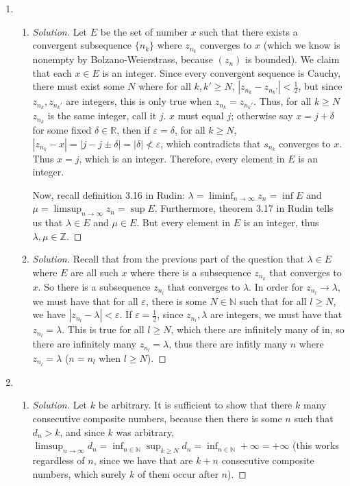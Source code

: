 \documentclass{article}
\newcommand{\N}{{\mathbb N}}
\newcommand{\Z}{{\mathbb Z}}
\newcommand{\R}{{\mathbb R}}
\newcommand{\ep}{{\varepsilon}}
\begin{document}
\begin{enumerate}
	\item
	\begin{enumerate}
		\item \begin{proof}[Solution]\let\qed\relax
			Let $E$ be the set of number $x$ such that
			there exists a convergent subsequence $\{n_k\}$ where
			$z_{n_k}$ converges to $x$
			(which we know is nonempty by Bolzano-Weierstrass,
			because $(z_n)$ is bounded).
			We claim that each $x \in E$ is an integer.
			Since every convergent sequence is Cauchy,
			there must exist some $N$ where for all $k,k' \geq N$,
			$|z_{n_k} - z_{n_k'}| < \frac{1}{2}$,
			but since $z_{n_k}, z_{n_k'}$ are integers,
			this is only true when $z_{n_k} = z_{n_k'}$.
			Thus, for all $k \geq N$ $z_{n_k}$ is the same integer, call it $j$.
			$x$ must equal $j$;
			otherwise say $x = j + \delta$ for some fixed $\delta\in\R$,
			then if $\ep = \delta$, for all $k \geq N$,
			$|z_{n_k} - x| = |j - j \pm \delta| = |\delta| \not< \ep$,
			which contradicts that $s_{n_k}$ converges to $x$.
			Thus $x = j$, which is an integer.
			Therefore, every element in $E$ is an integer.

			Now, recall definition 3.16 in Rudin:
			$\lambda = \liminf_{n \to \infty}z_n = \inf{E}$ and
			$\mu = \limsup_{n\to\infty}z_n = \sup{E}$.
			Furthermore, theorem 3.17 in Rudin tells us that
			$\lambda \in E$ and $\mu \in E$.
			But every element in $E$ is an integer, thus
			$\lambda,\mu \in \Z$.
		\end{proof}
		\item \begin{proof}[Solution]\let\qed\relax
			Recall that from the previous part of the question
			that $\lambda \in E$ where $E$
			are all such $x$ where there is a subsequence
			$z_{n_k}$ that converges to $x$.
			So there is a subsequence $z_{n_l}$
			that converges to $\lambda$.
			In order for $z_{n_l} \to \lambda$,
			we must have that for all $\ep$,
			there is some $N\in\N$ such that for all $l \geq N$,
			we have $|z_{n_l} - \lambda| < \ep$.
			If $\ep = \frac{1}{2}$,
			since $z_{n_l}, \lambda$ are integers,
			we must have that $z_{n_l} = \lambda$.
			This is true for all $l \geq N$,
			which there are infinitely many of in,
			so there are infinitely many $z_{n_l} = \lambda$,
			thus there are infitly many $n$ where $z_{n_l} = \lambda$
			($n = n_l$ when $l \geq N$).
		\end{proof}
	\end{enumerate}
	\item
	\begin{enumerate}
		\item \begin{proof}[Solution]\let\qed\relax
			Let $k$ be arbitrary.
			It is sufficient to show that there
			$k$ many consecutive composite numbers,
			because then there is some $n$ such that $d_n > k$,
			and since $k$ was arbitrary,
			$\limsup_{n\to\infty} d_n = \inf_{n\in\N} \sup_{k \geq N} d_n
			= \inf_{n\in\N} +\infty = +\infty$
			(this works regardless of $n$, since we have that are $k + n$
			consecutive composite numbers,
			which surely $k$ of them occur after $n$).
			

\end{proof}
\end{enumerate}
\end{enumerate}
\end{document}

